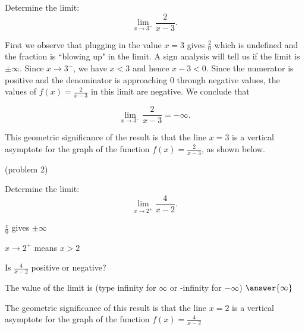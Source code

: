\documentclass[handout]{ximera}
\begin{document}
\begin{example}[example 2]
Determine the limit: 
\[
\lim_{x \to 3^-} \frac{2}{x-3}.
\] 


First we observe that plugging in the value $x=3$ gives $\frac{2}{0}$ which is undefined and 
the fraction is ``blowing up" in the limit.  A sign analysis will tell us if the limit is $\pm\infty$.
Since $x \to 3^-$, we have $x<3$ and hence $x-3 <0$. 
Since the numerator is positive and the denominator is approaching $0$ through negative values,
the values of $f(x) = \frac{2}{x-3}$ in this limit are negative.  We conclude that

\[
\lim_{x \to 3^-} \frac{2}{x-3} =  -\infty. 
\]

This geometric significance of the result is that the line $x=3$ is a vertical asymptote for the 
graph of the function $f(x) = \frac{2}{x-3}$, as shown below.




\begin{center}
\end{center}
\end{example}


\begin{problem}(problem 2)
  
	Determine the limit:
  \[
  \lim_{x \to 2^+} \frac{4}{x-2}.
  \]
		
		\begin{hint}
      $\frac{c}{0}$ gives $\pm \infty$
    \end{hint}
    \begin{hint}
      $x \to 2^+$ means $x>2$
    \end{hint}
    \begin{hint}
      Is $\frac{4}{x-2}$ positive or negative?
    \end{hint}
    
		The value of the limit is
		(type infinity for $\infty$ or -infinity for $-\infty$)
		 $\answer{\infty}$
		
		The geometric significance of this result is that the line $x=2$  
is a vertical asymptote for the graph of the function $f(x) = \frac{4}{x-2}$
\end{problem}
\end{document}
